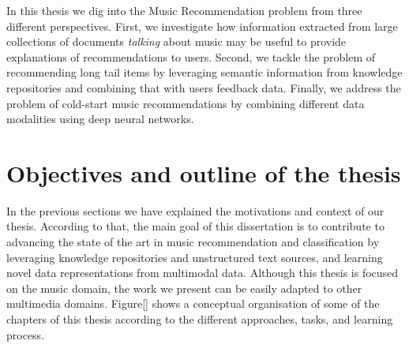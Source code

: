 In this thesis we dig into the Music Recommendation problem from three different perspectives. First, we investigate how information extracted from large collections of documents \textit{talking} about music may be useful to provide explanations of recommendations to users. Second, we tackle the problem of recommending long tail items by leveraging semantic information from knowledge repositories and combining that with users feedback data. Finally, we address the problem of cold-start music recommendations by combining different data modalities using deep neural networks.


\section{Objectives and outline of the thesis}
\label{sec:intro:objectives}

In the previous sections we have explained the motivations and context of our thesis. According to that, the main goal of this dissertation is to contribute to advancing the state of the art in music recommendation and classification by leveraging knowledge repositories and unstructured text sources, and learning novel data representations from multimodal data. Although this thesis is focused on the music domain, the work we present can be easily adapted to other multimedia domains. Figure\ref{} shows a conceptual organisation of some of the chapters of this thesis according to the different approaches, tasks, and learning process.

